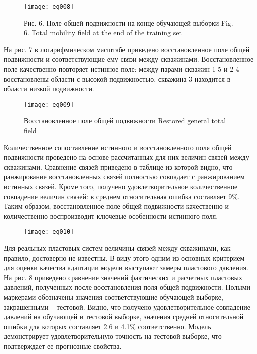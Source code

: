 \documentclass{article}
\begin{document}
\begin{figure}
	\centering
	\texttt{[image: eq008]}
	\caption{Рис. 6. Поле общей подвижности на конце обучающей выборки Fig. 6. Total mobility field at the end of the training set}
	\label{fig:eq008}
\end{figure}


На рис. 7 в логарифмическом масштабе приведено восстановленное поле общей подвижности и соответствующие ему связи между скважинами. Восстановленное поле качественно повторяет истинное поле: между парами скважин 1-5 и 2-4 восстановлены области с высокой подвижностью, скважина 3 находится в области низкой подвижности.

\begin{figure}
	\centering
	\texttt{[image: eq009]}
	\caption{Восстановленное поле общей подвижности Restored general total field}
	\label{fig:eq009}
\end{figure}


Количественное сопоставление истинного и восстановленного поля общей подвижности проведено на основе рассчитанных для них величин связей между скважинами. Сравнение связей приведено в таблице из которой видно, что ранжирование восстановленных связей полностью совпадает с ранжированием истинных связей. Кроме того, получено удовлетворительное количественное совпадение величин связей: в среднем относительная ошибка составляет 9\%. Таким образом, восстановленное поле общей подвижности качественно и количественно воспроизводит ключевые особенности истинного поля.
\begin{figure}
	\centering
	\texttt{[image: eq010]}
	\caption{}
	\label{fig:eq010}
\end{figure}


Для реальных пластовых систем величины связей между скважинами, как правило, достоверно не известны. В виду этого одним из основных критерием для оценки качества адаптации модели выступают замеры пластового давления. На рис. 8 приведено сравнение значений фактических и расчетных пластовых давлений, полученных после восстановления поля общей подвижности. Полыми маркерами обозначены значения соответствующие обучающей выборке, закрашенными – тестовой. Видно, что получено удовлетворительное совпадение давлений  на обучающей и тестовой выборке, значения средней относительной ошибки для которых составляет 2.6 и 4.1\% соответственно. Модель демонстрирует удовлетворительную точность на тестовой выборке, что подтверждает ее прогнозные свойства.
\end{document}
